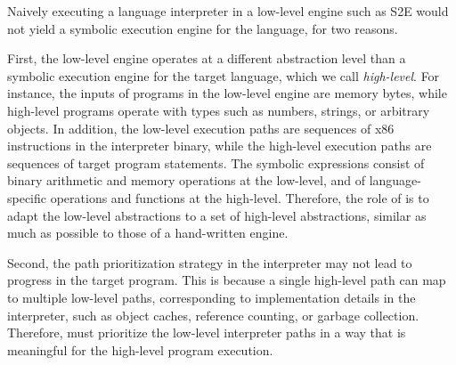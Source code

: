 
Naively executing a language interpreter in a low-level engine such as S2E would not yield a symbolic execution engine for the language, for two reasons.





First, the low-level engine operates at a different abstraction level than a symbolic execution engine for the target language, which we call \emph{high-level}.
%
For instance, the inputs of programs in the low-level engine are memory bytes, while high-level programs operate with types such as numbers, strings, or arbitrary objects.
%
In addition, the low-level execution paths are sequences of x86 instructions in the interpreter binary, while the high-level execution paths are sequences of target program statements.
%
The symbolic expressions consist of binary arithmetic and memory operations at the low-level, and of language-specific operations and functions at the high-level.
%
Therefore, the role of \chef is to adapt the low-level abstractions to a set of high-level abstractions, similar as much as possible to those of a hand-written engine.



Second, the path prioritization strategy in the interpreter may not lead to progress in the target program.
%
This is because a single high-level path can map to multiple low-level paths, corresponding to implementation details in the interpreter, such as object caches, reference counting, or garbage collection.
%
Therefore, \chef must prioritize the low-level interpreter paths in a way that is meaningful for the high-level program execution.

